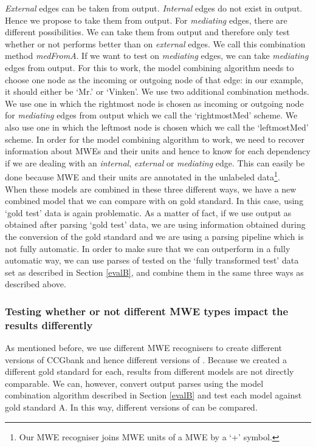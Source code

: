\documentclass[output=paper]{LSP/langsci}
\begin{document}
    \indent \textit{External} edges can be taken from output. \textit{Internal} edges do not exist in out\-put. Hence we propose to take them from output. For \textit{mediating} edges, there are different possibilities. We can take them from output and therefore only test whether or not \modelB performs better than \modelA on \textit{external} edges. We call this combination method \textit{medFromA}. If we want to test \modelB on \textit{mediating} edges, we can take \textit{mediating} edges from output. For this to work, the model combining algorithm needs to choose one node as the incoming or outgoing node of that edge: in our example, it should either be `Mr.' or `Vinken'. We use two additional combination methods. We use one in which the rightmost node is chosen as incoming or outgoing node for \textit{mediating} edges from output which we call the `rightmostMed' scheme. We also use one in which the leftmost node is chosen which we call the `leftmostMed' scheme. In order for the model combining algorithm to work, we need to recover information about MWEs and their units and hence to know for each dependency if we are dealing with an \textit{internal}, \textit{external} or \textit{mediating} edge. This can easily be done because MWE and their units are annotated in the unlabeled data\footnote{Our MWE recogniser joins MWE units of a MWE by a `+' symbol.}.\\
    \indent When these models are combined in these three different ways, we have a new combined model that we can compare with \modelA on gold standard. In this case, using `gold test' data is again problematic. As a matter of fact, if we use output as obtained after parsing `gold test' data, we are using information obtained during the conversion of the gold standard and we are using a parsing pipeline which is not fully automatic. In order to make sure that we can outperform \modelA in a fully automatic way, we can use parses of \modelB tested on the `fully transformed test' data set as described in Section \ref{evalB}, and combine them in the same three ways as described above.

    \subsubsection{Testing whether or not different MWE types impact the results differently}
    \label{evalB2}
    \indent As mentioned before, we use different MWE recognisers to create different versions of CCGbank and hence different versions of \modelB. Because we created a different gold standard for each, results from different models are not directly comparable. We can, however, convert output parses using the model combination algorithm described in Section \ref{evalB} and test each model against gold standard A. In this way, different versions of \modelB can be compared.
\end{document}
